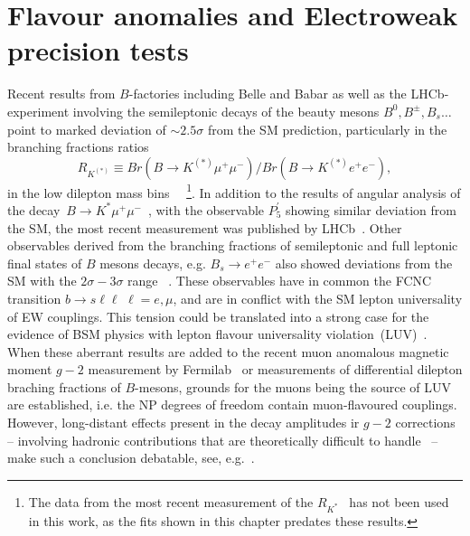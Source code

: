 
\chapter{Flavour anomalies and Electroweak precision tests}\label{chap:flav}
Recent results from $B$-factories including Belle and Babar as well as the LHCb-experiment involving the semileptonic decays of the beauty mesons $B^0, B^\pm,B_s \dots$ point to marked deviation of $ \sim 2.5 \sigma$ from the SM prediction, particularly in the branching fractions ratios
\begin{equation}
R_{K^{(*)}} \equiv Br(B \to K^{(*)} \mu^{+} \mu^{-}) / Br(B \to K^{(*)} e^{+} e^{-}),
\end{equation}
in the low dilepton mass bins ~\cite{Aaij:2014ora,Aaij:2017vbb,Aaij:2019wad,Abdesselam:2019wac,LHCb:2021trn}~\footnote{The data from the most recent measurement of the $R_{K^*}$~\cite{LHCb:2021trn} has not been used in this work, as the fits shown in this chapter predates these results.}. In addition to the results of angular analysis of the decay~$B \to K^{*} \mu^{+} \mu^{-}$~\cite{Descotes-Genon:2013wba,Descotes-Genon:2015uva}, with the observable $P_5^\prime$  showing similar deviation from the SM, the most recent measurement was published by LHCb~\cite{LHCb:2020lmf}. Other observables derived from the branching fractions of semileptonic and full leptonic final states of $B$ mesons decays, e.g. $ B_{s} \to e^{+} e^{-}$ also showed deviations from the SM with the $2\sigma-3\sigma$ range ~\cite{Chatrchyan:2013bka,Aaij:2017vad,Aaboud:2018mst,Aaij:2020nol}. These observables have in common the FCNC transition $ b \to s \ell \ell\, \, \ell = e, \mu$, and are in conflict with the SM lepton universality of EW couplings. This tension could be translated into a strong case for the evidence of BSM physics with lepton flavour universality violation~(LUV)~\cite{Hiller:2014yaa,Hiller:2014ula,Bordone:2016gaq}.\\
When these aberrant results are added to the recent muon anomalous magnetic moment $g-2$ measurement by Fermilab~\cite{Muong-2:2021ojo} or measurements of differential dilepton braching fractions of $B$-mesons,  grounds for the muons being the source of LUV are established, i.e.  the NP degrees of freedom contain muon-flavoured couplings.  However, long-distant effects present in the decay amplitudes ir $g-2$ corrections~\cite{Khodjamirian:2010vf,Lyon:2014hpa,Chobanova:2017ghn,Blake:2017fyh,Bobeth:2017vxj} -- involving hadronic contributions that are theoretically difficult to handle~\cite{Jager:2014rwa,Ciuchini:2015qxb,Arbey:2018ics,Chrzaszcz:2018yza} -- make such a conclusion debatable, see, e.g.~\cite{Ciuchini:2018anp,Hurth:2020rzx}. \\
